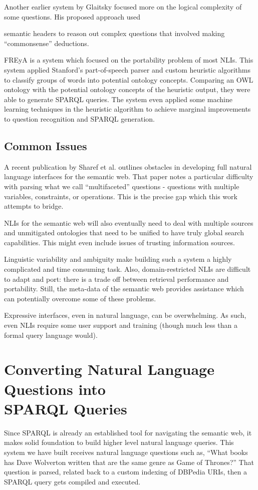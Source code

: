 \documentclass[11pt]{article}
\begin{document}
Another earlier system by Glaitsky\cite{galitsky2} focused more on the logical complexity
of some questions. His proposed approach used {semantic headers to reason out
complex questions that involved making ``commonsense'' deductions.

FREyA\cite{freya} is a system which focused on the portability problem of most
NLIs. This system applied Stanford's part-of-speech parser and custom heuristic algorithms
to classify groups of words into potential ontology concepts. Comparing an OWL ontology
with the potential ontology concepts of the heuristic output, they were able to generate
SPARQL queries. The system even applied some machine learning techniques in the 
heuristic algorithm to achieve marginal improvements to question recognition and SPARQL
generation. 

\subsection{Common Issues}
A recent publication by Sharef et al. \cite{issues} outlines obstacles in developing full
natural language interfaces for the semantic web. That paper notes a particular
difficulty with parsing what we call ``multifaceted'' questions - questions with multiple
variables, constraints, or operations. This is the precise gap which this work
attempts to bridge.

NLIs for the semantic web will also eventually need to deal with multiple sources
and unmitigated ontologies that need to be unified to have truly global search
capabilities\cite{issues}. This might even include issues of trusting information
sources\cite{semantic}.

Linguistic variability and ambiguity make building such a
system a highly complicated and time consuming task. Also,
domain-restricted NLIs are difficult to adapt and port:
there is a trade off between retrieval performance and portability. 
Still, the meta-data of the semantic web provides assistance
which can potentially overcome some of these problems. \cite{usability}

Expressive interfaces, even in natural language, can be overwhelming.
As such, even NLIs require some user support and training (though much less than
a formal query language would). \cite{usability}

\section{Converting Natural Language Questions into \\SPARQL Queries}
Since SPARQL is already an established tool for navigating the semantic
web, it makes solid foundation to build higher level natural language queries.
This system we have built receives natural language questions such as, 
``What books has Dave Wolverton written that are the same genre as Game of Thrones?''
That question is parsed, related back to a custom indexing of DBPedia URIs, then
a SPARQL query gets compiled and executed.

}
\end{document}
